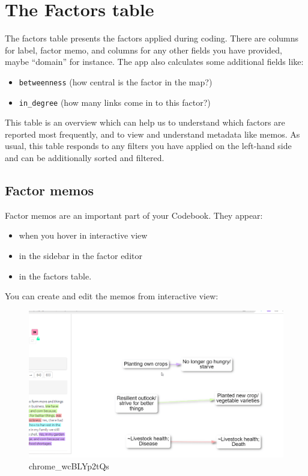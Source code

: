 \documentclass[
]{book}
\providecommand{\tightlist}{%
  \setlength{\itemsep}{0pt}\setlength{\parskip}{0pt}}
\begin{document}
\hypertarget{xthe-factors-table-old}{%
\chapter{The Factors table}\label{xthe-factors-table-old}}

The factors table presents the factors applied during coding. There are columns for label, factor memo, and columns for any other fields you have provided, maybe ``domain'' for instance. The app also calculates some additional fields like:

\begin{itemize}
\tightlist
\item
  \texttt{betweenness} (how central is the factor in the map?)
\item
  \texttt{in\_degree} (how many links come in to this factor?)
\end{itemize}

This table is an overview which can help us to understand which factors are reported most frequently, and to view and understand metadata like memos. As usual, this table responds to any filters you have applied on the left-hand side and can be additionally sorted and filtered.

\hypertarget{xfactormemos-old}{%
\section{Factor memos}\label{xfactormemos-old}}

Factor memos are an important part of your Codebook. They appear:

\begin{itemize}
\tightlist
\item
  when you hover in interactive view
\item
  in the sidebar in the factor editor
\item
  in the factors table.
\end{itemize}

You can create and edit the memos from interactive view:

\begin{figure}
\centering
\includegraphics[width=6.77083in,height=\textheight]{_assets/chrome_wcBLYp2tQs.gif}
\caption{chrome\_wcBLYp2tQs}
\end{figure}
\end{document}
